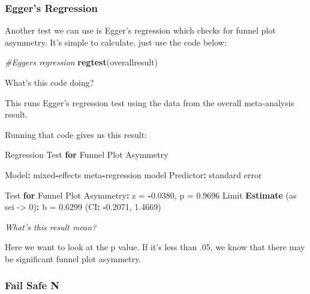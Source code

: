 \documentclass[
]{book}
\newenvironment{Shaded}{\begin{snugshade}}{\end{snugshade}}
\newcommand{\CommentTok}[1]{\textcolor[rgb]{0.56,0.35,0.01}{\textit{#1}}}
\newcommand{\ControlFlowTok}[1]{\textcolor[rgb]{0.13,0.29,0.53}{\textbf{#1}}}
\newcommand{\DecValTok}[1]{\textcolor[rgb]{0.00,0.00,0.81}{#1}}
\newcommand{\FloatTok}[1]{\textcolor[rgb]{0.00,0.00,0.81}{#1}}
\newcommand{\FunctionTok}[1]{\textcolor[rgb]{0.13,0.29,0.53}{\textbf{#1}}}
\newcommand{\NormalTok}[1]{#1}
\newcommand{\OtherTok}[1]{\textcolor[rgb]{0.56,0.35,0.01}{#1}}
\newcommand{\SpecialCharTok}[1]{\textcolor[rgb]{0.81,0.36,0.00}{\textbf{#1}}}
\begin{document}
\hypertarget{eggers-regression}{%
\subsubsection{Egger's Regression}\label{eggers-regression}}

Another test we can use is Egger's regression which checks for funnel plot asymmetry. It's simple to calculate, just use the code below:

\begin{Shaded}
\begin{Highlighting}[]
\CommentTok{\#Egger\textquotesingle{}s regression}
\FunctionTok{regtest}\NormalTok{(overallresult)}
\end{Highlighting}
\end{Shaded}

What's this code doing?

This runs Egger's regression test using the data from the overall meta-analysis result.

Running that code gives us this result:

\begin{Shaded}
\begin{Highlighting}[]
\NormalTok{Regression Test }\ControlFlowTok{for}\NormalTok{ Funnel Plot Asymmetry}

\NormalTok{Model}\SpecialCharTok{:}\NormalTok{     mixed}\SpecialCharTok{{-}}\NormalTok{effects meta}\SpecialCharTok{{-}}\NormalTok{regression model}
\NormalTok{Predictor}\SpecialCharTok{:}\NormalTok{ standard error}

\NormalTok{Test }\ControlFlowTok{for}\NormalTok{ Funnel Plot Asymmetry}\SpecialCharTok{:}\NormalTok{ z }\OtherTok{=} \SpecialCharTok{{-}}\FloatTok{0.0380}\NormalTok{, p }\OtherTok{=} \FloatTok{0.9696}
\NormalTok{Limit }\FunctionTok{Estimate}\NormalTok{ (as sei }\OtherTok{{-}\textgreater{}} \DecValTok{0}\NormalTok{)}\SpecialCharTok{:}\NormalTok{   b }\OtherTok{=}  \FloatTok{0.6299}\NormalTok{ (CI}\SpecialCharTok{:} \SpecialCharTok{{-}}\FloatTok{0.2071}\NormalTok{, }\FloatTok{1.4669}\NormalTok{)}
\end{Highlighting}
\end{Shaded}

\emph{What's this result mean?}

Here we want to look at the p value. If it's less than .05, we know that there may be significant funnel plot asymmetry.

\hypertarget{fail-safe-n}{%
\subsubsection{Fail Safe N}\label{fail-safe-n}}
\end{document}
